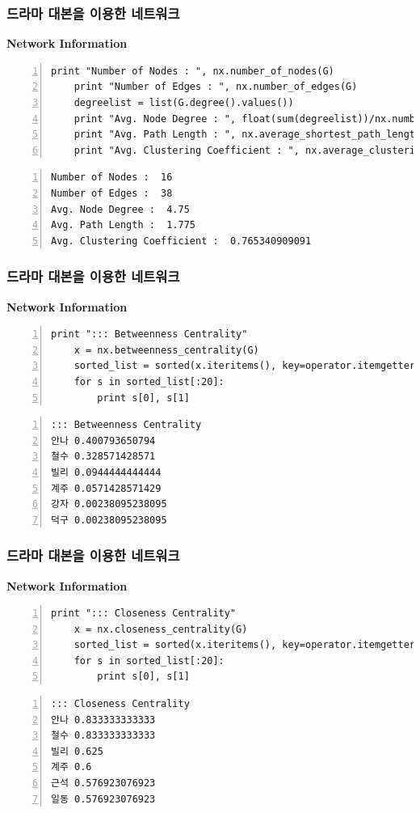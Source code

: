 \documentclass{beamer}
\begin{document}
\begin{frame}[fragile]
\frametitle{드라마 대본을 이용한 네트워크}
\textbf{Network Information}
\scriptsize
\begin{block}{}
\begin{Verbatim}[numbers=left,commandchars=\\\{\}]
    print "Number of Nodes : ", nx.number_of_nodes(G)
    print "Number of Edges : ", nx.number_of_edges(G)
    degreelist = list(G.degree().values())
    print "Avg. Node Degree : ", float(sum(degreelist))/nx.number_of_nodes(G)
    print "Avg. Path Length : ", nx.average_shortest_path_length(G)
    print "Avg. Clustering Coefficient : ", nx.average_clustering(G)
\end{Verbatim}
\end{block}
\begin{Verbatim}[numbers=left,commandchars=\\\{\}]
Number of Nodes :  16
Number of Edges :  38
Avg. Node Degree :  4.75
Avg. Path Length :  1.775
Avg. Clustering Coefficient :  0.765340909091
\end{Verbatim}
\end{frame}

\begin{frame}[fragile]
\frametitle{드라마 대본을 이용한 네트워크}
\textbf{Network Information}
\scriptsize
\begin{block}{}
\begin{Verbatim}[numbers=left,commandchars=\\\{\}]
    print "::: Betweenness Centrality"
    x = nx.betweenness_centrality(G)
    sorted_list = sorted(x.iteritems(), key=operator.itemgetter(1), reverse=True)
    for s in sorted_list[:20]:
        print s[0], s[1]
\end{Verbatim}
\end{block}
\begin{Verbatim}[numbers=left,commandchars=\\\{\}]
::: Betweenness Centrality
안나 0.400793650794
철수 0.328571428571
빌리 0.0944444444444
계주 0.0571428571429
강자 0.00238095238095
덕구 0.00238095238095
\end{Verbatim}
\end{frame}

\begin{frame}[fragile]
\frametitle{드라마 대본을 이용한 네트워크}
\textbf{Network Information}
\scriptsize
\begin{block}{}
\begin{Verbatim}[numbers=left,commandchars=\\\{\}]
    print "::: Closeness Centrality"
    x = nx.closeness_centrality(G)
    sorted_list = sorted(x.iteritems(), key=operator.itemgetter(1), reverse=True)
    for s in sorted_list[:20]:
        print s[0], s[1]
\end{Verbatim}
\end{block}
\begin{Verbatim}[numbers=left,commandchars=\\\{\}]
::: Closeness Centrality
안나 0.833333333333
철수 0.833333333333
빌리 0.625
계주 0.6
근석 0.576923076923
일동 0.576923076923
\end{Verbatim}
\end{frame}
\end{document}
